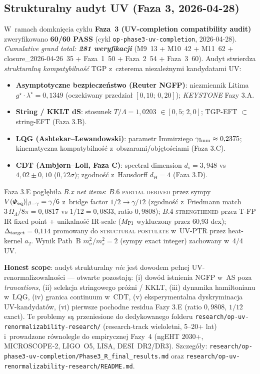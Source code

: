 \subsection*{Strukturalny audyt UV (Faza 3, 2026-04-28)}

\noindent
W~ramach domkni\k{e}cia cyklu \textbf{Faza~3 (UV-completion compatibility audit)}
zweryfikowano \textbf{60/60 PASS} (cykl \texttt{op-phase3-uv-completion},
2026-04-28). \textsl{Cumulative grand total: \textbf{281 weryfikacji}}
(M9~13 + M10~42 + M11~62 + closure\_2026-04-26~35 +
Faza~1~50 + Faza~2~54 + Faza~3~60).
Audyt stwierdza \emph{strukturaln\k{a} kompatybilno\'s\'c}
TGP z~czterema niezale\.znymi kandydatami UV:
\begin{itemize}[nosep]
\item \textbf{Asymptotyczne bezpiecze\'nstwo (Reuter NGFP)}: niezmiennik
  Litima $g^\star \!\cdot\! \lambda^\star = 0{,}1349$ (oczekiwany przedzia\l{}
  $[0{,}10;\,0{,}20]$); \textsl{KEYSTONE} Fazy 3.A.
\item \textbf{String / KKLT dS}: stosunek $T/\Lambda = 1{,}0203$
  $\in [0{,}5;\,2{,}0]$; TGP-EFT $\subset$ string-EFT (Faza 3.B).
\item \textbf{LQG (Ashtekar--Lewandowski)}: parametr Immirziego
  $\gamma_{\rm Imm} \approx 0{,}2375$; kinematyczna kompatybilno\'s\'c
  z~obszarami/obj\k{e}to\'sciami (Faza 3.C).
\item \textbf{CDT (Ambj\o rn--Loll, Faza C)}: spectral dimension
  $d_s = 3{,}948$ vs $4{,}02 \pm 0{,}10$ ($0{,}72\sigma$); zgodno\'s\'c
  z~Hausdorff $d_H = 4$ (Faza 3.D).
\end{itemize}

\noindent
Faza 3.E pog\l{}\k{e}bi\l{}a \emph{B.x net items}:
$B.6$ \textsc{partial derived} przez sympy
$V(\Phi_{\rm eq})|_{\beta=\gamma} = \gamma/6$ z~bridge factor $1/2 \to \gamma/12$
(zgodno\'s\'c z~Friedmann match $3\,\Omega_\Lambda/8\pi = 0{,}0817$ vs $1/12 = 0{,}0833$,
ratio $0{,}9808$); $B.4$ \textsc{strengthened} przez T-FP IR fixed point
+ unikalno\'s\'c IR-scale ($M_{\rm Pl}$ wykluczony przez 60{,}93 dex);
$\Delta_{\rm target} = 0{,}114$ promowany do \textsc{structural postulate}
w~UV-PTR przez heat-kernel $a_2$. Wynik Path~B
$m_\sigma^2 / m_s^2 = 2$ (sympy exact integer) zachowany w~4/4 UV.

\medskip\noindent
\textbf{Honest scope}: audyt strukturalny \emph{nie} jest dowodem
pe\l{}nej UV-renormalizowalno\'sci --- otwarte pozostaj\k{a}:
(i) dow\'od istnienia NGFP w~AS poza \textsl{truncations},
(ii) selekcja stringowego pr\'o\.zni / KKLT,
(iii) dynamika hamiltonianu w~LQG,
(iv) granica continuum w~CDT,
(v) eksperymentalna dyskryminacja UV-kandydat\'ow,
(vi) pierwsze pochodne residua Fazy 3.E (ratio $0{,}9808$, $1/12$ exact).
Te problemy s\k{a} przeniesione do dedykowanego folderu
\texttt{research/op-uv-renormalizability-research/}
(research-track wieloletni, 5--20+ lat) i~prowadzone r\'ownolegle
do empirycznej Fazy~4 (ngEHT 2030+, MICROSCOPE-2, LIGO~O5, LISA, DESI~DR2/DR3).
Szczeg\'o\l{}y: \texttt{research/op-phase3-uv-completion/Phase3\_R\_final\_results.md}
oraz \texttt{research/op-uv-renormalizability-research/README.md}.

